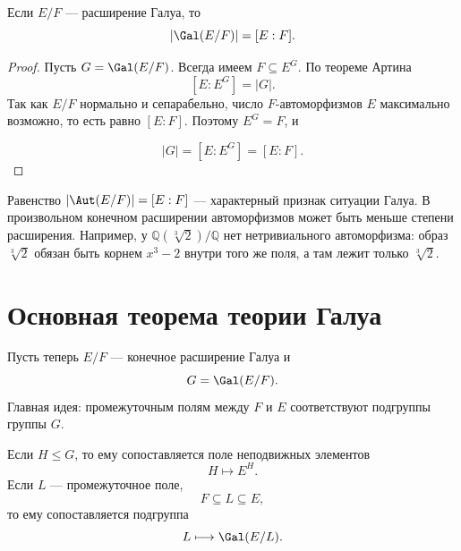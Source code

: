 \begin{cor}
Если $E/F$ --- расширение Галуа, то
\[
    |\Gal(E/F)| = [E:F].
\]
\begin{proof}
Пусть $G = \Gal(E/F)$. Всегда имеем $F \subseteq E^G$. По теореме Артина
\[
    [E:E^G] = |G|.
\]
Так как $E/F$ нормально и сепарабельно, число $F$-автоморфизмов $E$ максимально возможно, то есть равно
$[E:F]$. Поэтому $E^G = F$, и

\[
    |G| = [E:E^G] = [E:F].
\]
\end{proof}
\end{cor}

\begin{remark}
Равенство $|\Aut(E/F)| = [E:F]$ --- характерный признак ситуации Галуа. В произвольном конечном расширении автоморфизмов может быть меньше степени
расширения.
Например, у $\mathbb{Q}(\sqrt[3]{2})/\mathbb{Q}$ нет нетривиального автоморфизма: образ $\sqrt[3]{2}$ обязан быть корнем
$x^3-2$ внутри того же поля, а там лежит только $\sqrt[3]{2}$.
\end{remark}

\section{Основная теорема теории Галуа}

Пусть теперь $E/F$ --- конечное расширение Галуа и
\[
    G = \Gal(E/F).
\]
Главная идея: промежуточным полям между $F$ и $E$ соответствуют подгруппы группы $G$.

\begin{definition}
Если $H \leq G$, то ему сопоставляется поле неподвижных элементов
\[
    H \longmapsto E^H.
\]
Если $L$ --- промежуточное поле,
\[
    F \subseteq L \subseteq E,
\]
то ему сопоставляется подгруппа
\[
    L \longmapsto \Gal(E/L).
\]
\end{definition}

